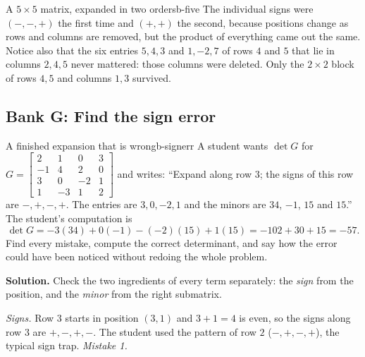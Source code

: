 \documentclass[11pt]{article}
\begin{document}
\begin{exmp}{A $5\times5$ matrix, expanded in two orders}{b-five}
The individual signs were $(-,-,+)$ the first time and $(+,+)$ the second, because positions change as rows and columns are removed, but the product of everything came out the same. Notice also that the six entries $5,4,3$ and $1,-2,7$ of rows $4$ and $5$ that lie in columns $2,4,5$ never mattered: those columns were deleted. Only the $2\times2$ block of rows $4,5$ and columns $1,3$ survived.
\end{exmp}

\subsection*{Bank G: Find the sign error}

\begin{exmp}{A finished expansion that is wrong}{b-signerr}
A student wants $\det G$ for $G=\begin{bmatrix}2&1&0&3\\-1&4&2&0\\3&0&-2&1\\1&-3&1&2\end{bmatrix}$ and writes: ``Expand along row $3$; the signs of this row are $-,+,-,+$. The entries are $3,0,-2,1$ and the minors are $34$, $-1$, $15$ and $15$.'' The student's computation is
\[
\det G=-3(34)+0(-1)-(-2)(15)+1(15)=-102+30+15=-57.
\]
Find every mistake, compute the correct determinant, and say how the error could have been noticed without redoing the whole problem.

\textbf{Solution.} Check the two ingredients of every term separately: the \emph{sign} from the position, and the \emph{minor} from the right submatrix.

\emph{Signs.} Row $3$ starts in position $(3,1)$ and $3+1=4$ is even, so the signs along row $3$ are $+,-,+,-$. The student used the pattern of row $2$ ($-,+,-,+$), the typical sign trap. \emph{Mistake 1.}


\end{exmp}
\end{document}
